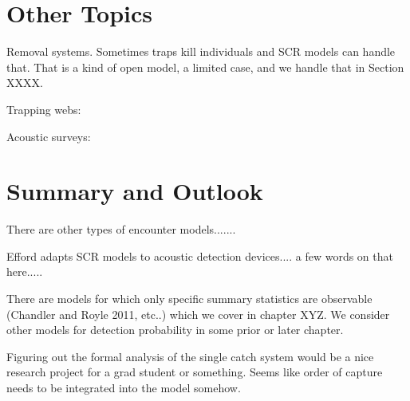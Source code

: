 \section{Other Topics}

Removal systems. Sometimes traps kill individuals and SCR models can handle
that. That is a kind of open model, a limited case, and we handle that
in Section XXXX.

Trapping webs:

Acoustic surveys:


\section{Summary and Outlook}

There are other types of encounter models.......

Efford adapts SCR models to acoustic detection devices.... a few words
on that here.....

There are models for which
only specific summary statistics are observable (Chandler and Royle
2011, etc..) which we cover in chapter XYZ.  We consider other models
for detection probability in some prior or later chapter. 


Figuring out the formal analysis of the single catch system would be
a nice research project for a grad student or something. 
Seems like order of capture needs to be integrated into the model somehow.

